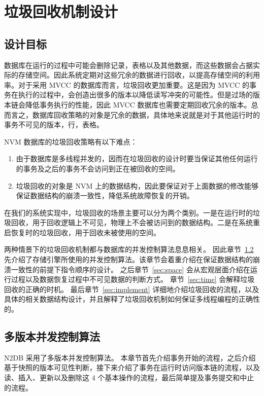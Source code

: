 
\chapter{垃圾回收机制设计}

\section{设计目标}

数据库在运行的过程中可能会删除记录，表格以及其他数据，而这些数据会占据实际的存储空间。因此系统定期对这些冗余的数据进行回收，以提高存储空间的利用率。对于采用 MVCC 的数据库而言，垃圾回收更加重要。这是因为 MVCC 的事务在执行的过程中，会创造出很多的版本以降低读写冲突的可能性。但是过场的版本链会降低事务执行的性能，因此 MVCC 数据库也需要定期回收冗余的版本。总而言之，数据库回收策略的对象是冗余的数据，具体地来说就是对于其他运行时的事务不可见的版本，行，表格。

NVM 数据库的垃圾回收策略有以下难点：

\begin{enumerate}
    \item 由于数据库是多线程并发的，因而在垃圾回收的设计时要当保证其他任何运行的事务及之后的事务不会访问到正在被回收的空间。
    \item 垃圾回收的对象是 NVM 上的数据结构，因此要保证对于上面数据的修改能够保证数据结构的崩溃一致性，降低系统故障恢复的开销。
\end{enumerate}

在我们的系统实现中，垃圾回收的场景主要可以分为两个类别。一是在运行时的垃圾回收，用于回收逻辑上不可见，物理上不会被访问到的数据结构。二是在系统重启恢复时的垃圾回收，用于回收未被使用的空间。

两种情景下的垃圾回收机制都与数据库的并发控制算法息息相关。
因此章节~\ref{sec:mvcc} 先介绍了存储引擎所使用的并发控制算法。该章节会着重介绍在保证数据结构的崩溃一致性的前提下指令顺序的设计。
之后章节~\ref{sec:space} 会从宏观层面介绍在运行过程以及数据恢复过程中不可见数据的判断方式。
章节~\ref{sec:time} 会解释垃圾回收的正确的时机。
最后章节~\ref{sec:implement} 详细地介绍垃圾回收的流程，以及具体的相关数据结构设计，并且解释了垃圾回收机制如何保证多线程编程的正确性的。

\section{多版本并发控制算法}
\label{sec:mvcc}
N2DB 采用了多版本并发控制算法。
本章节首先介绍事务开始的流程，之后介绍基于快照的版本可见性判断，接下来介绍了事务在运行时访问版本链的流程，以及读、插入、更新以及删除这 4 个基本操作的流程，最后简单提及事务提交和中止的流程。

